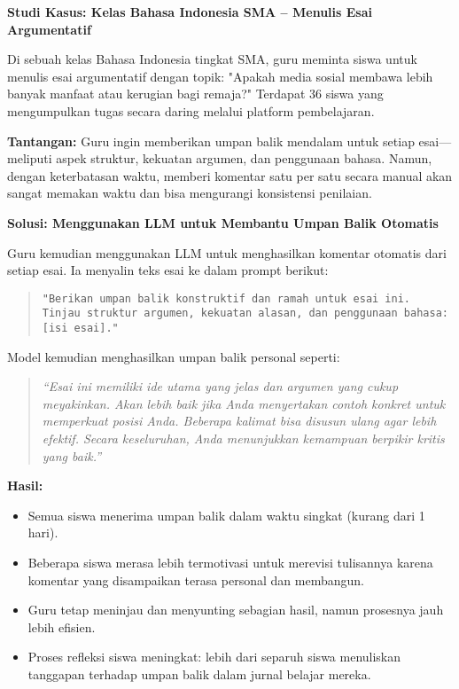 \textbf{Studi Kasus: Kelas Bahasa Indonesia SMA – Menulis Esai Argumentatif}

Di sebuah kelas Bahasa Indonesia tingkat SMA, guru meminta siswa untuk menulis esai argumentatif dengan topik: "Apakah media sosial membawa lebih banyak manfaat atau kerugian bagi remaja?" Terdapat 36 siswa yang mengumpulkan tugas secara daring melalui platform pembelajaran.

\textbf{Tantangan:}
Guru ingin memberikan umpan balik mendalam untuk setiap esai—meliputi aspek struktur, kekuatan argumen, dan penggunaan bahasa. Namun, dengan keterbatasan waktu, memberi komentar satu per satu secara manual akan sangat memakan waktu dan bisa mengurangi konsistensi penilaian.

\textbf{Solusi: Menggunakan LLM untuk Membantu Umpan Balik Otomatis}

Guru kemudian menggunakan LLM untuk menghasilkan komentar otomatis dari setiap esai. Ia menyalin teks esai ke dalam prompt berikut:

\begin{quote}
	\centering
	\texttt{"Berikan umpan balik konstruktif dan ramah untuk esai ini. Tinjau struktur argumen, kekuatan alasan, dan penggunaan bahasa: [isi esai]."}
\end{quote}

Model kemudian menghasilkan umpan balik personal seperti:

\begin{quote}
	\itshape
	“Esai ini memiliki ide utama yang jelas dan argumen yang cukup meyakinkan. Akan lebih baik jika Anda menyertakan contoh konkret untuk memperkuat posisi Anda. Beberapa kalimat bisa disusun ulang agar lebih efektif. Secara keseluruhan, Anda menunjukkan kemampuan berpikir kritis yang baik.”
\end{quote}

\textbf{Hasil:}
\begin{itemize}
	\item Semua siswa menerima umpan balik dalam waktu singkat (kurang dari 1 hari).
	\item Beberapa siswa merasa lebih termotivasi untuk merevisi tulisannya karena komentar yang disampaikan terasa personal dan membangun.
	\item Guru tetap meninjau dan menyunting sebagian hasil, namun prosesnya jauh lebih efisien.
	\item Proses refleksi siswa meningkat: lebih dari separuh siswa menuliskan tanggapan terhadap umpan balik dalam jurnal belajar mereka.
\end{itemize}

